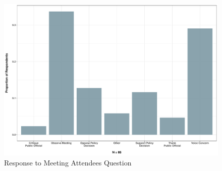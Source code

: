     \begin{figure}[H]
      \centering
       \text{}\par\medskip
      \includegraphics[scale=0.43]{Figures/CCESMeeting.pdf}
      \caption[Response to Meeting Attendees Question]{\footnotesize{Response to Meeting Attendees Question}}
      \label{}
    \end{figure}